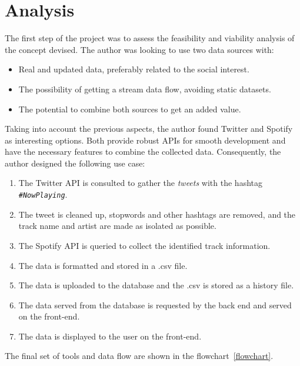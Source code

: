 
\section{Analysis}

\nonzeroparskip The first step of the project was to assess the feasibility and viability analysis of the concept devised. The author was looking to use two data sources with:

\begin{itemize}
	\item Real and updated data, preferably related to the social interest.
	\item The possibility of getting a stream data flow, avoiding static datasets.
	\item The potential to combine both sources to get an added value.
\end{itemize}

\nonzeroparskip Taking into account the previous aspects, the author found Twitter and Spotify as interesting options. Both provide robust APIs for smooth development and have the necessary features to combine the collected data. Consequently, the author designed the following use case:

\begin{enumerate}
	\item The Twitter API is consulted to gather the \textit{tweets} with the hashtag \texttt{\textit{\#NowPlaying}}.
	\item The tweet is cleaned up, stopwords and other hashtags are removed, and the track name and artist are made as isolated as possible.
	\item The Spotify API is queried to collect the identified track information.
	\item The data is formatted and stored in a .csv file.
	\item The data is uploaded to the database and the .csv is stored as a history file.
	\item The data served from the database is requested by the back end and served on the front-end.
	\item The data is displayed to the user on the front-end.
\end{enumerate}

\nonzeroparskip The final set of tools and data flow are shown in the flowchart~\ref{flowchart}. 

